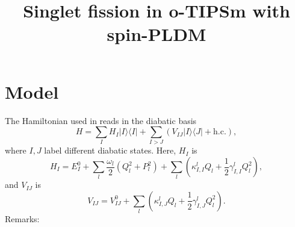 \documentclass{article}
\begin{document}
\title{Singlet fission in o-TIPSm with spin-PLDM}
\maketitle
\section{Model}\label{sec:Model}
The Hamiltonian used in \cite{reddy2018intramolecular} reads in the diabatic basis
\begin{equation}
	H = \sum_{I} H_I \vert I\rangle\langle I\vert + \sum_{I>J} (V_{IJ}\vert I\rangle \langle J\vert +\mathrm{h.c.}),
\end{equation}
where $I,J$ label different diabatic states. Here, $H_I$ is 
\begin{equation}
	H_I = E_I^0 + \sum_l \frac{\omega_l}{2}\left(Q_l^2 + P_l^2\right) + \sum_l \left(\kappa_{I,I}^l Q_l + \frac{1}{2}\gamma_{I,I}^l Q_l^2\right),\label{eq:HamI}
\end{equation}
and $V_{IJ}$ is
\begin{equation}
	V_{IJ} = V_{IJ}^0 + \sum_l \left(\kappa_{I,J}^l Q_l + \frac{1}{2}\gamma_{I,J}^l Q_l^2\right).\label{eq:HamIJ}
\end{equation}
Remarks:
\end{document}
